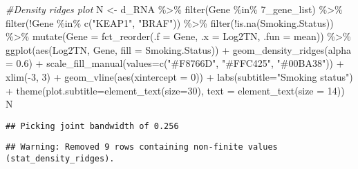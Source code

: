 \documentclass[
]{article}
\newenvironment{Shaded}{\begin{snugshade}}{\end{snugshade}}
\newcommand{\AttributeTok}[1]{\textcolor[rgb]{0.77,0.63,0.00}{#1}}
\newcommand{\CommentTok}[1]{\textcolor[rgb]{0.56,0.35,0.01}{\textit{#1}}}
\newcommand{\DecValTok}[1]{\textcolor[rgb]{0.00,0.00,0.81}{#1}}
\newcommand{\FloatTok}[1]{\textcolor[rgb]{0.00,0.00,0.81}{#1}}
\newcommand{\FunctionTok}[1]{\textcolor[rgb]{0.00,0.00,0.00}{#1}}
\newcommand{\NormalTok}[1]{#1}
\newcommand{\OtherTok}[1]{\textcolor[rgb]{0.56,0.35,0.01}{#1}}
\newcommand{\SpecialCharTok}[1]{\textcolor[rgb]{0.00,0.00,0.00}{#1}}
\newcommand{\StringTok}[1]{\textcolor[rgb]{0.31,0.60,0.02}{#1}}
\begin{document}
\begin{Shaded}
\begin{Highlighting}[]
\CommentTok{\#Density ridges plot}
\NormalTok{N }\OtherTok{\textless{}{-}}\NormalTok{ d\_RNA }\SpecialCharTok{\%\textgreater{}\%}
 \FunctionTok{filter}\NormalTok{(Gene }\SpecialCharTok{\%in\%} \StringTok{\textasciigrave{}}\AttributeTok{7\_gene\_list}\StringTok{\textasciigrave{}}\NormalTok{) }\SpecialCharTok{\%\textgreater{}\%}
 \FunctionTok{filter}\NormalTok{(}\SpecialCharTok{!}\NormalTok{Gene }\SpecialCharTok{\%in\%} \FunctionTok{c}\NormalTok{(}\StringTok{"KEAP1"}\NormalTok{, }\StringTok{"BRAF"}\NormalTok{)) }\SpecialCharTok{\%\textgreater{}\%}
 \FunctionTok{filter}\NormalTok{(}\SpecialCharTok{!}\FunctionTok{is.na}\NormalTok{(Smoking.Status)) }\SpecialCharTok{\%\textgreater{}\%}
 \FunctionTok{mutate}\NormalTok{(}\AttributeTok{Gene =} \FunctionTok{fct\_reorder}\NormalTok{(}\AttributeTok{.f =}\NormalTok{ Gene, }\AttributeTok{.x =}\NormalTok{ Log2TN, }\AttributeTok{.fun =}\NormalTok{ mean)) }\SpecialCharTok{\%\textgreater{}\%}
 \FunctionTok{ggplot}\NormalTok{(}\FunctionTok{aes}\NormalTok{(Log2TN, Gene, }\AttributeTok{fill =}\NormalTok{ Smoking.Status)) }\SpecialCharTok{+} 
 \FunctionTok{geom\_density\_ridges}\NormalTok{(}\AttributeTok{alpha =} \FloatTok{0.6}\NormalTok{) }\SpecialCharTok{+}
 \FunctionTok{scale\_fill\_manual}\NormalTok{(}\AttributeTok{values=}\FunctionTok{c}\NormalTok{(}\StringTok{"\#F8766D"}\NormalTok{, }\StringTok{"\#FFC425"}\NormalTok{, }\StringTok{"\#00BA38"}\NormalTok{)) }\SpecialCharTok{+}
 \FunctionTok{xlim}\NormalTok{(}\SpecialCharTok{{-}}\DecValTok{3}\NormalTok{, }\DecValTok{3}\NormalTok{) }\SpecialCharTok{+}
 \FunctionTok{geom\_vline}\NormalTok{(}\FunctionTok{aes}\NormalTok{(}\AttributeTok{xintercept =} \DecValTok{0}\NormalTok{)) }\SpecialCharTok{+}
 \FunctionTok{labs}\NormalTok{(}\AttributeTok{subtitle=}\StringTok{"Smoking status"}\NormalTok{) }\SpecialCharTok{+}
 \FunctionTok{theme}\NormalTok{(}\AttributeTok{plot.subtitle=}\FunctionTok{element\_text}\NormalTok{(}\AttributeTok{size=}\DecValTok{30}\NormalTok{),}
 \AttributeTok{text =} \FunctionTok{element\_text}\NormalTok{(}\AttributeTok{size =} \DecValTok{14}\NormalTok{))}
\NormalTok{N}
\end{Highlighting}
\end{Shaded}

\begin{verbatim}
## Picking joint bandwidth of 0.256
\end{verbatim}

\begin{verbatim}
## Warning: Removed 9 rows containing non-finite values (stat_density_ridges).
\end{verbatim}
\end{document}
